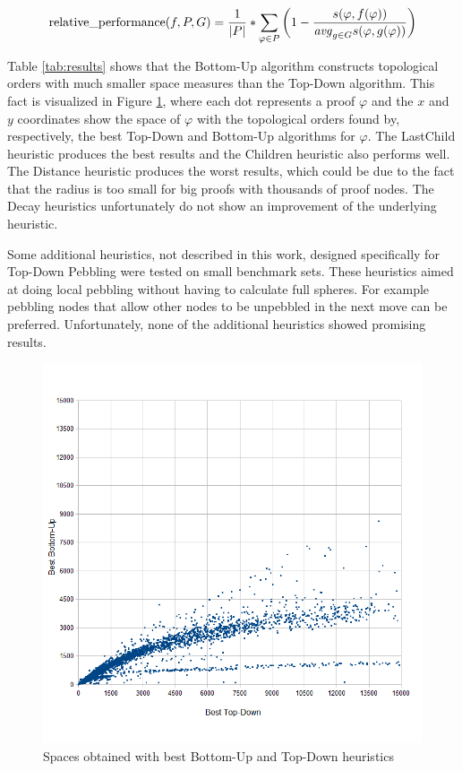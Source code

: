 \begin{align}
  \operatorname{relative\_performance}(f,P,G) = \frac{1}{|P|} * \sum_{\varphi \in P}{\left( 1 -
    \frac{
      s(\varphi,f(\varphi))
    }{
        \mathit{avg}_{g\in G}{s(\varphi,g(\varphi))}
    } \right)
  }
  \label{eq:space}
\end{align}

Table \ref{tab:results} shows that the Bottom-Up algorithm constructs topological orders with much smaller space measures than the Top-Down algorithm. 
This fact is visualized in Figure \ref{fig:BUvsTD}, where each dot represents a proof $\varphi$ and the $x$ and $y$ coordinates show the space of $\varphi$ with the topological orders found by, respectively, the best Top-Down and Bottom-Up algorithms for $\varphi$.
The LastChild heuristic produces the best results and the Children heuristic also performs well.
The Distance heuristic produces the worst results, which could be due to the fact that the radius is too small for big proofs with thousands of proof nodes.
The Decay heuristics unfortunately do not show an improvement of the underlying heuristic.

Some additional heuristics, not described in this work, designed specifically for Top-Down Pebbling were tested on small benchmark sets.
These heuristics aimed at doing local pebbling without having to calculate full spheres.
For example pebbling nodes that allow other nodes to be unpebbled in the next move can be preferred.
Unfortunately, none of the additional heuristics showed promising results.


\begin{figure}
	\centering
	\includegraphics[scale=0.4]{Figures/TD_vs_BU-scatter_min.png}
	\caption{Spaces obtained with best Bottom-Up and Top-Down heuristics}
	\label{fig:BUvsTD}
\end{figure}


